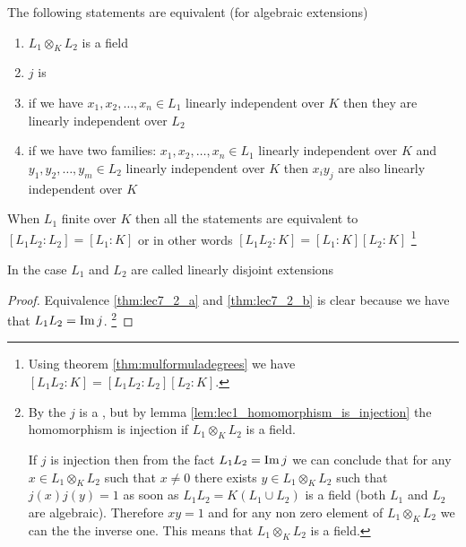 \begin{theorem}
  \label{thm:lec7_2}
  The following statements are equivalent (for algebraic extensions)
  \begin{enumerate}
  \item $L_1 \otimes_K L_2$ is a field \label{thm:lec7_2_a}
  \item $j$ is  \label{thm:lec7_2_b}
  \item if we have $x_1, x_2, \dots, x_n \in L_1$ linearly independent
    over $K$ then they are linearly independent
    over $L_2$ \label{thm:lec7_2_c}
  \item if we have two families: $x_1, x_2, \dots, x_n \in L_1$ linearly independent
    over $K$ and  $y_1, y_2, \dots, y_m \in L_2$ linearly independent
    over $K$ then $x_i y_j$ are also linearly independent over $K$
    \label{thm:lec7_2_d}
  \end{enumerate}
  When $L_1$ finite over $K$ then all the statements are equivalent to
  $\left[L_1 L_2 : L_2\right] = \left[L_1 : K\right]$ or in other
  words
  $\left[L_1 L_2 : K\right] = \left[L_1 : K\right] \left[L_2 :
    K\right]$
  \footnote{
    Using theorem \ref{thm:mulformuladegrees} we have $\left[L_1 L_2 :
      K\right]  = \left[L_1 L_2 : L_2\right] \left[L_2 : K\right]$.
  }
  
  \begin{definition}
    In the case $L_1$ and $L_2$ are called linearly disjoint extensions
    \label{def:linearlydisjoint}
  \end{definition}
  \begin{proof}
    Equivalence \ref{thm:lec7_2_a} and \ref{thm:lec7_2_b} is clear
    because we have that $L_1 L_2 = \operatorname{Im} j$.
    \footnote{
      By the  $j$ is a 
      , but by lemma
      \ref{lem:lec1_homomorphism_is_injection} the homomorphism is
      injection if $L_1 \otimes_K L_2$ is a field.

      If $j$ is injection then from the fact $L_1 L_2 = \operatorname{Im} j$ we can
      conclude that for any $x \in L_1 \otimes_K L_2$ such that $x \ne
      0$ there exists
      $y \in L_1 \otimes_K L_2$ such that $j(x) j(y) = 1$ as soon as
      $L_1 L_2 = K\left(L_1 \cup L_2\right)$ is a field
      (both $L_1$ and $L_2$ are algebraic). Therefore
      $x y = 1$ and for any non zero element of $L_1 \otimes_K L_2$ we
      can the the inverse one. This means that $L_1 \otimes_K L_2$ is
      a field.
    }


\end{proof}
\end{theorem}
